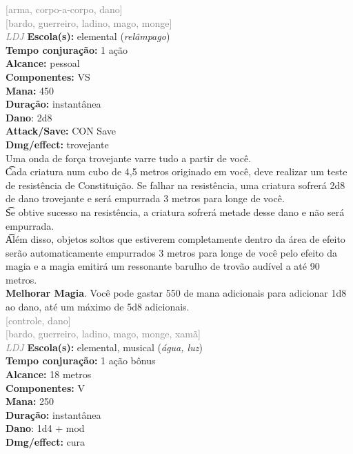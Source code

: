 \documentclass{RPG_Adventure}[2021/10/20]
\begin{document}
{\scriptsize \textcolor{gray}{[arma, corpo-a-corpo, dano]\\}}
{\scriptsize \textcolor{gray}{[bardo, guerreiro, ladino, mago, monge]\\}}
{\tiny \textcolor{gray}{\textit{LDJ}}}\jump{}
{\small \t \textbf{Escola(s):} elemental (\textit{relâmpago})\\\t \textbf{Tempo conjuração:} 1 ação\\\t \textbf{Alcance:} pessoal\\\t \textbf{Componentes:} VS\\\t \textbf{Mana:} 450\\\t \textbf{Duração:} instantânea\\\t \textbf{Dano}: 2d8\\\t \textbf{Attack/Save:} CON Save\\\t \textbf{Dmg/effect:} trovejante\\}
{\normalsize Uma onda de força trovejante varre tudo a partir de você.\\\t Cada criatura num cubo de 4,5 metros originado em você, deve realizar um teste de resistência de Constituição. Se falhar na resistência, uma criatura sofrerá 2d8 de dano trovejante e será empurrada 3 metros para longe de você.\\\t Se obtive sucesso na resistência, a criatura sofrerá metade desse dano e não será empurrada.\\\t Além disso, objetos soltos que estiverem completamente dentro da área de efeito serão automaticamente empurrados 3 metros para longe de você pelo efeito da magia e a magia emitirá um ressonante barulho de trovão audível a até 90 metros.\\\t \textbf{Melhorar Magia}. Você pode gastar 550 de mana adicionais para adicionar 1d8 ao dano, até um máximo de 5d8 adicionais.\\}
{\scriptsize \textcolor{gray}{[controle, dano]\\}}
{\scriptsize \textcolor{gray}{[bardo, guerreiro, ladino, mago, monge, xamã]\\}}
{\tiny \textcolor{gray}{\textit{LDJ}}}\jump{}
{\small \t \textbf{Escola(s):} elemental, musical (\textit{água, luz})\\\t \textbf{Tempo conjuração:} 1 ação bônus\\\t \textbf{Alcance:} 18 metros\\\t \textbf{Componentes:} V\\\t \textbf{Mana:} 250\\\t \textbf{Duração:} instantânea\\\t \textbf{Dano}: 1d4 + mod\\\t \textbf{Dmg/effect:} cura\\}
\end{document}
